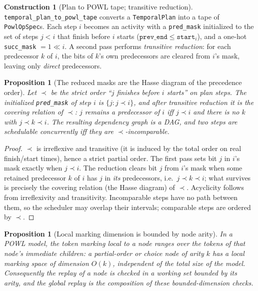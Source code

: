 \documentclass[11pt,oneside]{book}
\theoremstyle{definition}
\newtheorem{construction}{Construction}[chapter]
\theoremstyle{plain}
\newtheorem{proposition}[theorem]{Proposition}
\theoremstyle{remark}
\newcommand{\code}[1]{\texttt{#1}}
\begin{document}
\begin{construction}[Plan to POWL tape; transitive reduction]\label{con:tape}
\code{temporal\_plan\_to\_powl\_tape} converts a \code{TemporalPlan} into a tape of
\code{PowlOpSpec}s. Each step $i$ becomes an activity with a \code{pred\_mask} initialized to
the set of steps $j<i$ that finish before $i$ starts
($\code{prev\_end}\le\code{start}_i$), and a one-hot \code{succ\_mask} $=1\!\ll\! i$. A second
pass performs \emph{transitive reduction}: for each predecessor $k$ of $i$, the bits of $k$'s
own predecessors are cleared from $i$'s mask, leaving only \emph{direct} predecessors.
\end{construction}

\begin{proposition}[The reduced masks are the Hasse diagram of the precedence order]\label{prop:hasse}
Let $\prec$ be the strict order ``$j$ finishes before $i$ starts'' on plan steps. The
initialized \code{pred\_mask} of step $i$ is $\{j:j\prec i\}$, and after transitive reduction it
is the covering relation of $\prec$: $j$ remains a predecessor of $i$ iff $j\prec i$ and there
is no $k$ with $j\prec k\prec i$. The resulting dependency graph is a DAG, and two steps are
schedulable concurrently iff they are $\prec$-incomparable.
\end{proposition}

\begin{proof}
$\prec$ is irreflexive and transitive (it is induced by the total order on real finish/start
times), hence a strict partial order. The first pass sets bit $j$ in $i$'s mask exactly when
$j\prec i$. The reduction clears bit $j$ from $i$'s mask when some retained predecessor $k$ of
$i$ has $j$ in \emph{its} predecessors, i.e.\ $j\prec k\prec i$; what survives is precisely the
covering relation (the Hasse diagram) of $\prec$. Acyclicity follows from irreflexivity and
transitivity. Incomparable steps have no path between them, so the scheduler may overlap their
intervals; comparable steps are ordered by $\prec$. \end{proof}

\begin{proposition}[Local marking dimension is bounded by node arity]\label{prop:local}
In a POWL model, the token marking local to a node ranges over the tokens of that node's
immediate children: a partial-order or choice node of arity $k$ has a local marking space of
dimension $O(k)$, independent of the total size of the model. Consequently the replay of a
node is checked in a working set bounded by its arity, and the global replay is the composition
of these bounded-dimension checks.
\end{proposition}
\end{document}
